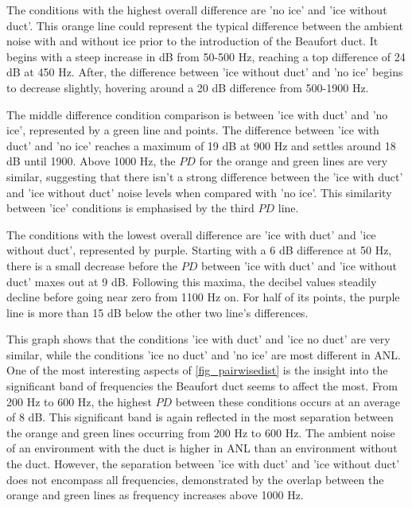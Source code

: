 The conditions with the highest overall difference are 'no ice' and 'ice without duct'. This orange line could represent the typical difference between the ambient noise with and without ice prior to the introduction of the Beaufort duct. It begins with a steep increase in dB from 50-500 Hz, reaching a top difference of 24 dB at 450 Hz. After, the difference between 'ice without duct' and 'no ice' begins to decrease slightly, hovering around a 20 dB difference from 500-1900 Hz.

The middle difference condition comparison is between 'ice with duct' and 'no ice', represented by a green line and points. The difference between 'ice with duct' and 'no ice' reaches a maximum of 19 dB at 900 Hz and settles around 18 dB until 1900. Above 1000 Hz, the $PD$ for the orange and green lines are very similar, suggesting that there isn't a strong difference between the 'ice with duct' and 'ice without duct' noise levels when compared with 'no ice'. This  similarity between 'ice' conditions is emphasised by the third $PD$ line.

The conditions with the lowest overall difference are 'ice with duct' and 'ice without duct', represented by purple. Starting with a 6 dB difference at 50 Hz, there is a small decrease before the $PD$ between 'ice with duct' and 'ice without duct' maxes out at 9 dB. Following this maxima, the decibel values steadily decline before going near zero from 1100 Hz on. For half of its points, the purple line is more than 15 dB below the other two line's differences.  

This graph shows that the conditions 'ice with duct' and 'ice no duct' are very similar, while the conditions 'ice no duct' and 'no ice' are most different in ANL. One of the most interesting aspects of \autoref{fig_pairwisedist} is the insight into the significant band of frequencies the Beaufort duct seems to affect the most. From 200 Hz to 600 Hz, the highest $PD$ between these conditions occurs at an average of 8 dB. This significant band is again reflected in the most separation between the orange and green lines occurring from 200 Hz to 600 Hz. The ambient noise of an environment with the duct is higher in ANL than an environment without the duct. However, the separation between 'ice with duct' and 'ice without duct' does not encompass all frequencies, demonstrated by the overlap between the orange and green lines as frequency increases above 1000 Hz.


